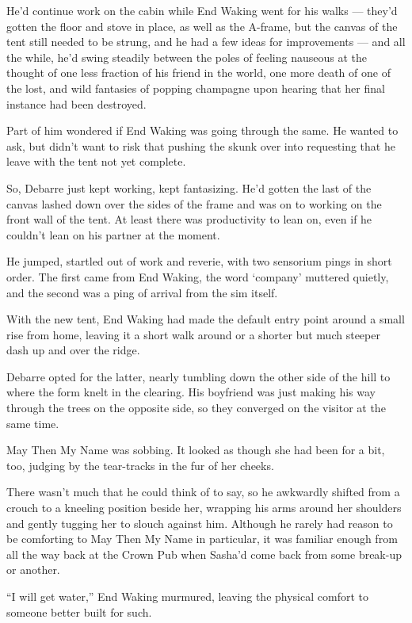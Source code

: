 He'd continue work on the cabin while End Waking went for his walks — they'd gotten the floor and stove in place, as well as the A-frame, but the canvas of the tent still needed to be strung, and he had a few ideas for improvements — and all the while, he'd swing steadily between the poles of feeling nauseous at the thought of one less fraction of his friend in the world, one more death of one of the lost, and wild fantasies of popping champagne upon hearing that her final instance had been destroyed.

Part of him wondered if End Waking was going through the same. He wanted to ask, but didn't want to risk that pushing the skunk over into requesting that he leave with the tent not yet complete.

So, Debarre just kept working, kept fantasizing. He'd gotten the last of the canvas lashed down over the sides of the frame and was on to working on the front wall of the tent. At least there was productivity to lean on, even if he couldn't lean on his partner at the moment.

He jumped, startled out of work and reverie, with two sensorium pings in short order. The first came from End Waking, the word `company' muttered quietly, and the second was a ping of arrival from the sim itself.

With the new tent, End Waking had made the default entry point around a small rise from home, leaving it a short walk around or a shorter but much steeper dash up and over the ridge.

Debarre opted for the latter, nearly tumbling down the other side of the hill to where the form knelt in the clearing. His boyfriend was just making his way through the trees on the opposite side, so they converged on the visitor at the same time.

May Then My Name was sobbing. It looked as though she had been for a bit, too, judging by the tear-tracks in the fur of her cheeks.

There wasn't much that he could think of to say, so he awkwardly shifted from a crouch to a kneeling position beside her, wrapping his arms around her shoulders and gently tugging her to slouch against him. Although he rarely had reason to be comforting to May Then My Name in particular, it was familiar enough from all the way back at the Crown Pub when Sasha'd come back from some break-up or another.

``I will get water,'' End Waking murmured, leaving the physical comfort to someone better built for such.

